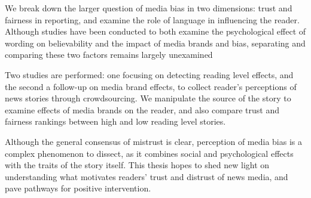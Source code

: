 We break down the larger question of media bias in two dimensions: trust and fairness in reporting, and examine the role of language in influencing the reader.  Although studies have been conducted to both examine the psychological effect of wording on believability and the impact of media brands and bias, separating and comparing these two factors remains largely unexamined \cite{weisberg2008seductive, baum2008eye}

Two studies are performed: one focusing on detecting reading level effects, and the second a follow-up on media brand effects, to collect reader's perceptions of news stories through crowdsourcing. We manipulate the source of the story to examine effects of media brands on the reader, and also compare trust and fairness rankings between high and low reading level stories.

Although the general consensus of mistrust is clear, perception of media bias is a complex phenomenon to dissect, as it combines social and psychological effects with the traits of the story itself. This thesis hopes to shed new light on understanding what motivates readers' trust and distrust of news media, and pave pathways for positive intervention.

 